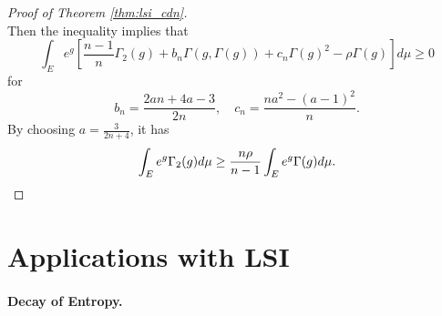 \begin{proof}[Proof of Theorem \ref{thm:lsi_cdn}]
\begin{equation*}
    \end{equation*}
    Then the inequality implies that
    \begin{equation*}
        \int_E e^g\left[\frac{n-1}{n} \Gamma_2(g)+b_n \Gamma(g, \Gamma(g))+c_n \Gamma(g)^2-\rho \Gamma(g)\right] d \mu \geq 0
    \end{equation*}
    for
    \begin{equation*}
        b_n=\frac{2 a n+4 a-3}{2 n},\quad c_n=\frac{n a^2-(a-1)^2}{n} .
    \end{equation*}
    By choosing $a = \frac{3}{2n+4}$, it has
    \begin{equation*}
        \int_E e^g \Gamma_2(g) d \mu \geq \frac{n \rho}{n-1} \int_E e^g \Gamma(g) d \mu.\qedhere
    \end{equation*}
\end{proof}
   
\section{Applications with LSI}

\paragraph{Decay of Entropy.}


